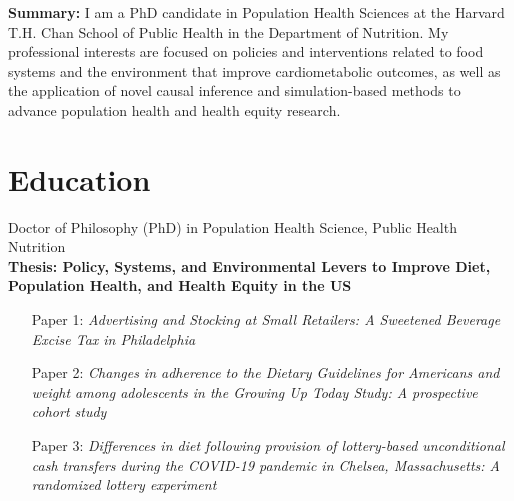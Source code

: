 \documentclass{cv_style}
\begin{document}
\begin{center}
\end{center}


\begin{adjustwidth}{0.7cm}{0.7cm} \parskip 8pt \begin{small} \textbf{Summary:} I am a PhD candidate in Population Health Sciences at the Harvard T.H. Chan School of Public Health in the Department of Nutrition. My professional interests are focused on policies and interventions related to food systems and the environment that improve cardiometabolic outcomes, as well as the application of novel causal inference and simulation-based methods to advance population health and health equity research.  
\end{small}
\end{adjustwidth}


\parskip -5pt 
\section{Education}
\parskip -5pt
\parskip -4pt \noindent Doctor of Philosophy (PhD) in Population Health Science, Public Health Nutrition \\
\textbf{Thesis: Policy, Systems, and Environmental Levers to Improve Diet, Population Health, and Health Equity in the US}\\

\vspace{-1em}
    \begingroup
    \addtolength{\leftmargini}{3em} \begin{itemize}
        \item[\hspace{1em}Paper 1:] \textit{Advertising and Stocking at Small Retailers: {{A}} Sweetened Beverage Excise Tax in {{Philadelphia}}} \vspace{0.8em}
        \item [\hspace{1em}Paper 2:] \textit{Changes in adherence to the Dietary Guidelines for Americans and weight among adolescents in the Growing Up Today Study: A prospective cohort study} \vspace{0.8em} 
        \item [\hspace{1em}Paper 3:] \textit{Differences in diet following provision of lottery-based unconditional cash transfers during the COVID-19 pandemic in Chelsea, Massachusetts: A randomized lottery experiment}
    \end{itemize}
    \endgroup
\end{document}
